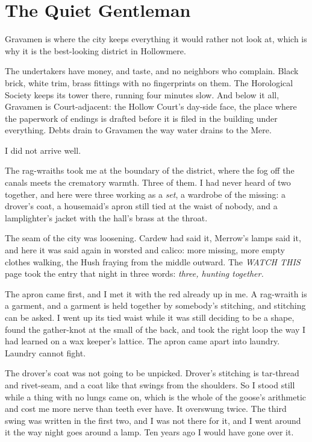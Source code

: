 \chapter{The Quiet Gentleman}

Gravamen is where the city keeps everything it would rather not look at, which is why it is the best-looking district in Hollowmere.

The undertakers have money, and taste, and no neighbors who complain. Black brick, white trim, brass fittings with no fingerprints on them. The Horological Society keeps its tower there, running four minutes slow. And below it all, Gravamen is Court-adjacent: the Hollow Court's day-side face, the place where the paperwork of endings is drafted before it is filed in the building under everything. Debts drain to Gravamen the way water drains to the Mere.

I did not arrive well.

The rag-wraiths took me at the boundary of the district, where the fog off the canals meets the crematory warmth. Three of them. I had never heard of two together, and here were three working as a \emph{set}, a wardrobe of the missing: a drover's coat, a housemaid's apron still tied at the waist of nobody, and a lamplighter's jacket with the hall's brass at the throat.

The seam of the city was loosening. Cardew had said it, Merrow's lamps said it, and here it was said again in worsted and calico: more missing, more empty clothes walking, the Hush fraying from the middle outward. The \emph{WATCH THIS} page took the entry that night in three words: \emph{three, hunting together.}

The apron came first, and I met it with the red already up in me. A rag-wraith is a garment, and a garment is held together by somebody's stitching, and stitching can be asked. I went up its tied waist while it was still deciding to be a shape, found the gather-knot at the small of the back, and took the right loop the way I had learned on a wax keeper's lattice. The apron came apart into laundry. Laundry cannot fight.

The drover's coat was not going to be unpicked. Drover's stitching is tar-thread and rivet-seam, and a coat like that swings from the shoulders. So I stood still while a thing with no lungs came on, which is the whole of the goose's arithmetic and cost me more nerve than teeth ever have. It overswung twice. The third swing was written in the first two, and I was not there for it, and I went around it the way night goes around a lamp. Ten years ago I would have gone over it.

